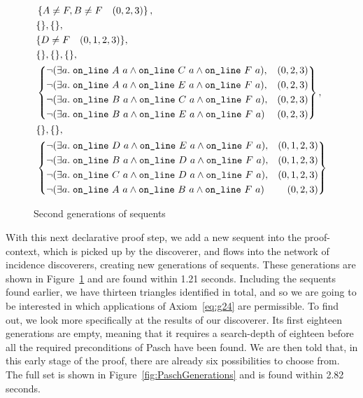\begin{figure}[H]
{\begin{minipage}{\linewidth}
\begin{displaymath}
\begin{split}
    &\left\{A\neq F, B\neq F \quad (0,2,3)\right\},\\
    &\{\},\{\},\\
    &\{D\neq F \quad (0,1,2,3)\},\\
    &\{\},\{\},\{\},\\
    &\left\{\begin{aligned} 
        &\neg(\exists a.\; \texttt{on\_line}\ A\ a\wedge \texttt{on\_line}\ C\ a\wedge \texttt{on\_line}\ F\ a), & (0,2,3)\\
        &\neg(\exists a.\; \texttt{on\_line}\ A\ a\wedge \texttt{on\_line}\ E\ a\wedge \texttt{on\_line}\ F\ a), & (0,2,3)\\
        &\neg(\exists a.\; \texttt{on\_line}\ B\ a\wedge \texttt{on\_line}\ C\ a\wedge \texttt{on\_line}\ F\ a), & (0,2,3)\\
        &\neg(\exists a.\; \texttt{on\_line}\ B\ a\wedge \texttt{on\_line}\ E\ a\wedge \texttt{on\_line}\ F\ a) & (0,2,3)\end{aligned}\right\},\\
    &\{\},\{\},\\
    &\left\{\begin{aligned} 
        &\neg(\exists a.\; \texttt{on\_line}\ D\ a\wedge \texttt{on\_line}\ E\ a\wedge \texttt{on\_line}\ F\ a), & (0,1,2,3)\\
        &\neg(\exists a.\; \texttt{on\_line}\ B\ a\wedge \texttt{on\_line}\ D\ a\wedge \texttt{on\_line}\ F\ a), & (0,1,2,3)\\
        &\neg(\exists a.\; \texttt{on\_line}\ C\ a\wedge \texttt{on\_line}\ D\ a\wedge \texttt{on\_line}\ F\ a), & (0,1,2,3)\\
        &\neg(\exists a.\; \texttt{on\_line}\ A\ a\wedge \texttt{on\_line}\ B\ a\wedge \texttt{on\_line}\ F\ a) & (0,2,3)\end{aligned}\right\}
\end{split}
\end{displaymath}
\end{minipage}}
\caption{Second generations of sequents}
\label{fig:SecondGenerations}
\end{figure}

With this next declarative proof step, we add a new sequent into the proof-context, which is picked up by the  discoverer, and flows into the network of incidence discoverers, creating new generations of sequents. These generations are shown in Figure~\ref{fig:SecondGenerations} and are found within 1.21 seconds. Including the sequents found earlier, we have thirteen triangles identified in total, and so we are going to be interested in which applications of Axiom~\ref{eq:g24} are permissible. To find out, we look more specifically at the results of our  discoverer. Its first eighteen generations are empty, meaning that it requires a search-depth of eighteen before all the required preconditions of Pasch have been found. We are then told that, in this early stage of the proof, there are already six possibilities to choose from. The full set is shown in Figure~\ref{fig:PaschGenerations} and is found within 2.82 seconds.

